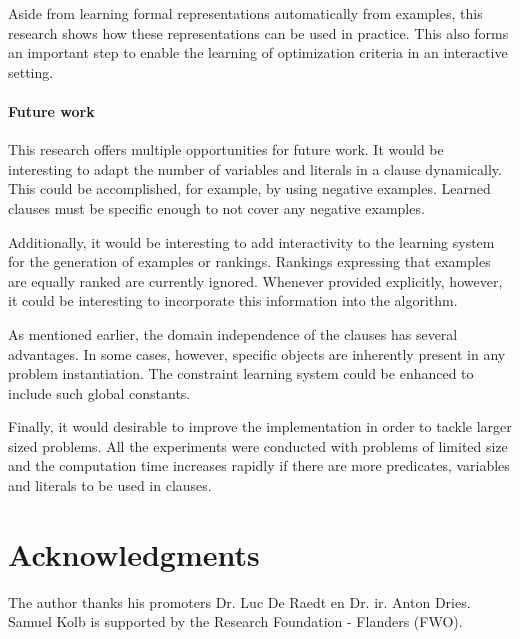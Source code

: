 \documentclass[letterpaper]{article}
\theoremstyle{definition}
\begin{document}
Aside from learning formal representations automatically from examples, this research shows how these representations can be used in practice.
This also forms an important step to enable the learning of optimization criteria in an interactive setting.

\paragraph{Future work}
This research offers multiple opportunities for future work.
It would be interesting to adapt the number of variables and literals in a clause dynamically.
This could be accomplished, for example, by using negative examples.
Learned clauses must be specific enough to not cover any negative examples. 

Additionally, it would be interesting to add interactivity to the learning system for the generation of examples or rankings.
Rankings expressing that examples are equally ranked are currently ignored.
Whenever provided explicitly, however, it could be interesting to incorporate this information into the algorithm.

As mentioned earlier, the domain independence of the clauses has several advantages.
In some cases, however, specific objects are inherently present in any problem instantiation.
The constraint learning system could be enhanced to include such global constants.

Finally, it would desirable to improve the implementation in order to tackle larger sized problems.
All the experiments were conducted with problems of limited size and the computation time increases rapidly if there are more predicates, variables and literals to be used in clauses.

\section*{Acknowledgments}
The author thanks his promoters Dr. Luc De Raedt en Dr. ir. Anton Dries.
Samuel Kolb is supported by the Research Foundation - Flanders (FWO).

\newpage

%
%


\end{document}
